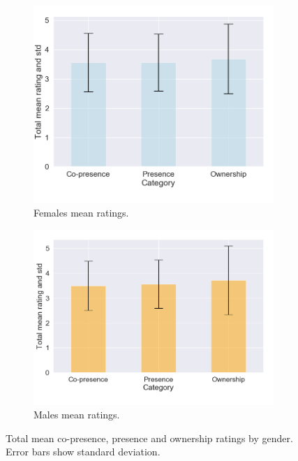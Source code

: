 \begin{figure}[H]
\begin{subfigure}[b]{0.5\textwidth}
 \includegraphics[scale=0.45]{Files/Plots/misc_all_mean_f.png}
 \caption{Females mean ratings. }
 \label{fig:miscAllFemales}
 \end{subfigure}
  \hspace{10mm}
\begin{subfigure}[b]{1\textwidth}
 \centering
 \includegraphics[scale=0.45]{Files/Plots/misc_all_mean_m.png}
 \caption{Males mean ratings.}
 \label{fig:miscAllMales}
 \end{subfigure}
 \caption{Total mean co-presence, presence and ownership ratings by gender. Error bars show standard deviation. }
\label{fig:miscAllGendered}
\end{figure}



